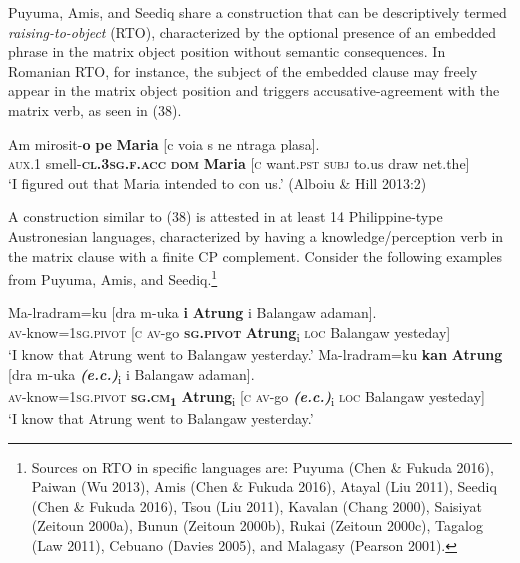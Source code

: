 \documentclass[10pt]{article}
\begin{document}
Puyuma, Amis, and Seediq share a construction that can be descriptively termed \textit{raising-to-object} (RTO), characterized by the optional presence of an embedded phrase in the matrix object position without semantic consequences. In Romanian RTO, for instance, the subject of the embedded clause may freely appear in the matrix object position and triggers accusative-agreement with the matrix verb, as seen in (38).

 \begin{exe}

\gll Am mirosit-\textbf{o} \textbf{pe} \textbf{Maria} [c voia s ne ntraga plasa].\\
\textsc{aux.1} smell-\textsc{\textbf{cl.3sg.f.acc}}  {\textbf{\textsc{dom}}} \textbf{Maria} [\textsc{c} want.\textsc{pst} \textsc{subj} to.us draw net.the]  \\
 \trans `I figured out that Maria intended to con us.' (Alboiu \& Hill 2013:2)

\end{exe}


 A construction similar to (38) is attested in at least 14 Philippine-type Austronesian languages, characterized by having a  knowledge/perception verb in the matrix clause with a finite CP complement. Consider the following examples from Puyuma, Amis, and Seediq.\footnote{Sources on RTO in specific languages are: Puyuma (Chen \& Fukuda 2016), Paiwan (Wu 2013), Amis (Chen \& Fukuda 2016), Atayal (Liu 2011), Seediq (Chen \& Fukuda 2016), Tsou (Liu 2011), Kavalan (Chang 2000), Saisiyat (Zeitoun 2000a), Bunun (Zeitoun 2000b), Rukai (Zeitoun 2000c), Tagalog (Law 2011), Cebuano (Davies 2005), and Malagasy (Pearson 2001).}


 \begin{exe}
     \begin{xlist}
     
      		\ex
 		\gll Ma-lradram=ku  [dra m-uka \textbf{i} \textbf{Atrung} i Balangaw adaman].\\
\textsc{av}-know=\textsc{1sg.pivot}  [\textsc{c} \textsc{av-}go  {\textbf{\textsc{sg.pivot}}} \textbf{Atrung}\textsubscript{i}  \textsc{loc} Balangaw yesteday]  \\
             \trans `I know that Atrung went to Balangaw yesterday.'
 		\ex
 		\gll Ma-lradram=ku \textbf{kan} {\textbf{Atrung}} [dra m-uka \textbf{\textit{(e.c.)}}\textsubscript{i} i Balangaw adaman].\\
\textsc{av}-know=\textsc{1sg.pivot} \textbf{{\textsc{sg.cm}\textsubscript{1}}} \textbf{{Atrung}}\textsubscript{i}  [\textsc{c} \textsc{av-}go \textbf{\textit{(e.c.)}}\textsubscript{i} \textsc{loc} Balangaw yesteday]  \\
             \trans `I know that Atrung went to Balangaw yesterday.'
         
\end{xlist}         
\end{exe}
\end{document}
